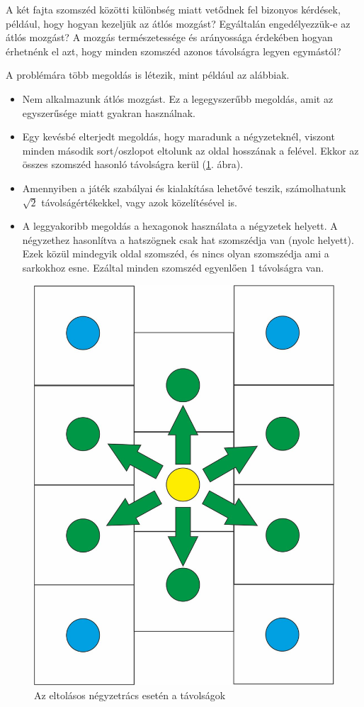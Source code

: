 A két fajta szomszéd közötti különbség miatt vetődnek fel bizonyos kérdések, például, hogy hogyan kezeljük az átlós mozgást? Egyáltalán engedélyezzük-e az átlós mozgást? A mozgás természetessége és arányossága érdekében hogyan érhetnénk el azt, hogy minden szomszéd azonos távolságra legyen egymástól?

A problémára több megoldás is létezik, mint például az alábbiak.
\begin{itemize}
\item Nem alkalmazunk átlós mozgást. Ez a legegyszerűbb megoldás, amit az egyszerűsége miatt gyakran használnak.
\item Egy kevésbé elterjedt megoldás, hogy maradunk a négyzeteknél, viszont minden második sort/oszlopot eltolunk az oldal hosszának a felével. Ekkor az összes szomszéd hasonló távolságra kerül (\ref{fig:SqOffsetDistance}. ábra).
\item Amennyiben a játék szabályai és kialakítása lehetővé teszik, számolhatunk $\sqrt{2}$ távolságértékekkel, vagy azok közelítésével is.
\item A leggyakoribb megoldás a hexagonok használata a négyzetek helyett. A négyzethez hasonlítva a hatszögnek csak hat szomszédja van (nyolc helyett). Ezek közül mindegyik oldal szomszéd, és nincs olyan szomszédja ami a sarkokhoz esne. Ezáltal minden szomszéd egyenlően 1 távolságra van.
\end{itemize}

\begin{figure}[h!]
\centering
\includegraphics[scale=0.3]{kepek/SqOffsetDistance.jpg}
\caption{Az eltolásos négyzetrács esetén a távolságok}
\label{fig:SqOffsetDistance}
\end{figure}

